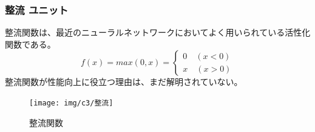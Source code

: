 \subsubsection{整流 ユニット}
整流関数は、最近のニューラルネットワークにおいてよく用いられている活性化関数である。
\begin{equation}
f(x) = max(0, x) = \left\{\begin{array}{cc} 0\quad (x < 0)\\ x \quad (x > 0)\end{array}\right.
\end{equation}
整流関数が性能向上に役立つ理由は、まだ解明されていない。

\begin{figure}[tbp]
 \centering
  \texttt{[image: img/c3/整流]}
 \caption{整流関数}
 \label{c3_整流}
\end{figure}

